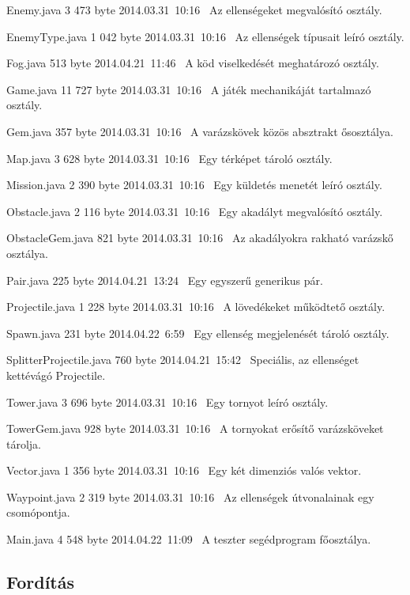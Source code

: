 \begin{fajllista}

\fajl
{Enemy.java}
{3 473 byte}
{2014.03.31~10:16~}
{Az ellenségeket megvalósító osztály.}

\fajl
{EnemyType.java}
{1 042 byte}
{2014.03.31~10:16~}
{Az ellenségek típusait leíró osztály.}

\fajl
{Fog.java}
{513 byte}
{2014.04.21~11:46~}
{A köd viselkedését meghatározó osztály.}

\fajl
{Game.java}
{11 727 byte}
{2014.03.31~10:16~}
{A játék mechanikáját tartalmazó osztály.}

\fajl
{Gem.java}
{357 byte}
{2014.03.31~10:16~}
{A varázskövek közös absztrakt ősosztálya.}

\fajl
{Map.java}
{3 628 byte}
{2014.03.31~10:16~}
{Egy térképet tároló osztály.}

\fajl
{Mission.java}
{2 390 byte}
{2014.03.31~10:16~}
{Egy küldetés menetét leíró osztály.}

\fajl
{Obstacle.java}
{2 116 byte}
{2014.03.31~10:16~}
{Egy akadályt megvalósító osztály.}

\fajl
{ObstacleGem.java}
{821 byte}
{2014.03.31~10:16~}
{Az akadályokra rakható varázskő osztálya.}

\fajl
{Pair.java}
{225 byte}
{2014.04.21~13:24~}
{Egy egyszerű generikus pár.}

\fajl
{Projectile.java}
{1 228 byte}
{2014.03.31~10:16~}
{A lövedékeket működtető osztály.}

\fajl
{Spawn.java}
{231 byte}
{2014.04.22~6:59~}
{Egy ellenség megjelenését tároló osztály.}

\fajl
{SplitterProjectile.java}
{760 byte}
{2014.04.21~15:42~}
{Speciális, az ellenséget kettévágó Projectile.}

\fajl
{Tower.java}
{3 696 byte}
{2014.03.31~10:16~}
{Egy tornyot leíró osztály.}

\fajl
{TowerGem.java}
{928 byte}
{2014.03.31~10:16~}
{A tornyokat erősítő varázsköveket tárolja.}

\fajl
{Vector.java}
{1 356 byte}
{2014.03.31~10:16~}
{Egy két dimenziós valós vektor.}

\fajl
{Waypoint.java}
{2 319 byte}
{2014.03.31~10:16~}
{Az ellenségek útvonalainak egy csomópontja.}


\fajl
{Main.java}
{4 548 byte}
{2014.04.22~11:09~}
{A teszter segédprogram főosztálya.}


\end{fajllista}

\subsection{Fordítás}

